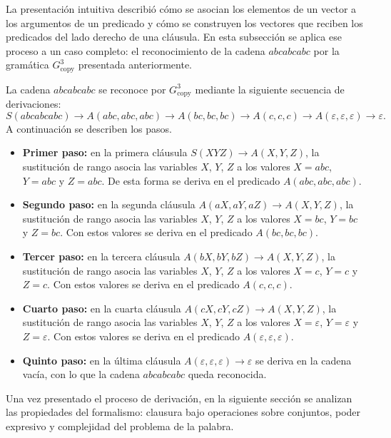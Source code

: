 \documentclass{report}
\theoremstyle{definition}
\theoremstyle{plain}
\theoremstyle{remark}
\begin{document}
La presentación intuitiva describió cómo se asocian los elementos de
un vector a los argumentos de un predicado y cómo se construyen los
vectores que reciben los predicados del lado derecho de una cláusula.
En esta subsección se aplica ese proceso a un caso completo: el
reconocimiento de la cadena $abcabcabc$ por la gramática
$G_{\mathrm{copy}}^3$ presentada anteriormente.

La cadena $abcabcabc$ se reconoce por $G_{\mathrm{copy}}^3$ mediante
la siguiente secuencia de derivaciones:
\[
  S(abcabcabc) \to A(abc, abc, abc) \to A(bc, bc, bc) \to A(c, c, c)
  \to A(\varepsilon, \varepsilon, \varepsilon) \to \varepsilon.
\]
A continuación se describen los pasos.
\begin{itemize}
  \item \textbf{Primer paso:} en la primera cláusula
    $S(XYZ) \to A(X, Y, Z)$, la sustitución de rango asocia las
    variables $X$, $Y$, $Z$ a los valores $X = abc$, $Y = abc$ y
    $Z = abc$. De esta forma se deriva en el predicado $A(abc, abc,
    abc)$.
  \item \textbf{Segundo paso:} en la segunda cláusula
    $A(aX, aY, aZ) \to A(X, Y, Z)$, la sustitución de rango asocia las
    variables $X$, $Y$, $Z$ a los valores $X = bc$, $Y = bc$ y
    $Z = bc$. Con estos valores se deriva en el predicado
    $A(bc, bc, bc)$.
  \item \textbf{Tercer paso:} en la tercera cláusula
    $A(bX, bY, bZ) \to A(X, Y, Z)$, la sustitución de rango asocia las
    variables $X$, $Y$, $Z$ a los valores $X = c$, $Y = c$ y $Z = c$.
    Con estos valores se deriva en el predicado $A(c, c, c)$.
  \item \textbf{Cuarto paso:} en la cuarta cláusula
    $A(cX, cY, cZ) \to A(X, Y, Z)$, la sustitución de rango asocia las
    variables $X$, $Y$, $Z$ a los valores $X = \varepsilon$,
    $Y = \varepsilon$ y $Z = \varepsilon$. Con estos valores se deriva
    en el predicado $A(\varepsilon, \varepsilon, \varepsilon)$.
  \item \textbf{Quinto paso:} en la última cláusula
    $A(\varepsilon, \varepsilon, \varepsilon) \to \varepsilon$ se deriva
    en la cadena vacía, con lo que la cadena $abcabcabc$ queda
    reconocida.
\end{itemize}

Una vez presentado el proceso de derivación, en la siguiente sección se
analizan las propiedades del formalismo: clausura bajo operaciones sobre
conjuntos, poder expresivo y complejidad del problema de la palabra.
\end{document}
